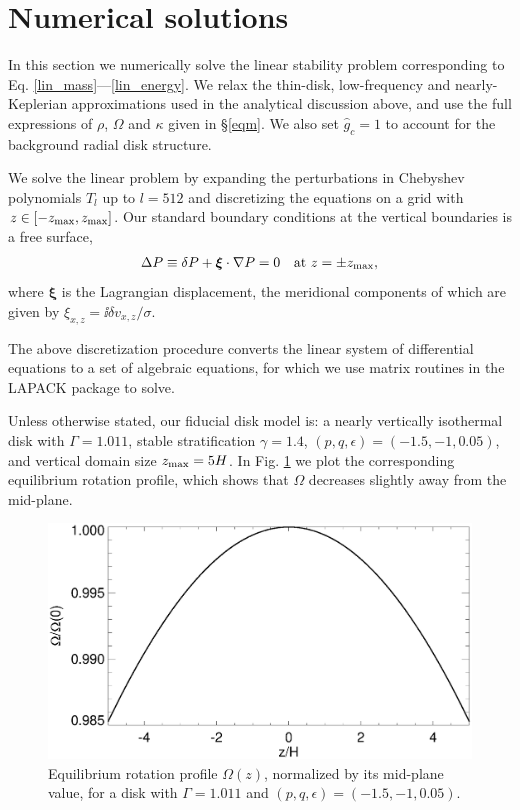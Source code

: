 \section{Numerical solutions}\label{numerical}
In this section we numerically solve the linear stability problem
corresponding to Eq. \ref{lin_mass}---\ref{lin_energy}. 
We relax the thin-disk, low-frequency and nearly-Keplerian
approximations used in the analytical discussion above, and  
use the full expressions of $\rho$, $\Omega$ and
$\kappa$ given in \S\ref{eqm}. We also set $\hat{g}_c=1$ to
account for the background radial disk structure.  

We solve the linear problem by expanding the
perturbations in Chebyshev polynomials $T_l$ up to $l=512$
and discretizing the equations on a grid with
$z\in[-z_\mathrm{max},z_\mathrm{max}]$. Our standard boundary conditions at the vertical
boundaries is a free surface, 
\begin{align}
  \Delta P \equiv \delta P + \bm{\xi}\cdot\nabla P= 0 \quad \text{at } z=\pm z_\mathrm{max},
\end{align}
where $\bm{\xi}$ is the Lagrangian displacement, the meridional
components of which are given by $\xi_{x,z} = \ii\delta
v_{x,z}/\sigma$. 

The above discretization procedure
converts the linear system of differential equations to a set of 
algebraic equations, for which we use matrix routines in the LAPACK
package to solve. 

Unless otherwise stated, our fiducial disk model is: a nearly 
vertically isothermal disk with $\Gamma=1.011$, stable
stratification $\gamma=1.4$, $(p,q,\epsilon)=(-1.5,-1,0.05)$, and 
vertical domain size $z_\mathrm{max}=5H$. In Fig. \ref{omega_z} we plot the
corresponding equilibrium rotation profile, which shows that $\Omega$
decreases slightly away from the mid-plane.  

\begin{figure}
  \includegraphics[width=\linewidth,clip=true,trim=0cm 0cm 0cm
  0cm]{figures/omega2} 
  \caption{Equilibrium rotation profile $\Omega(z)$,
    normalized by its mid-plane value, for a disk with $\Gamma=1.011$
    and $(p,q,\epsilon)=(-1.5,-1,0.05)$. 
    \label{omega_z} 
  }
\end{figure}

